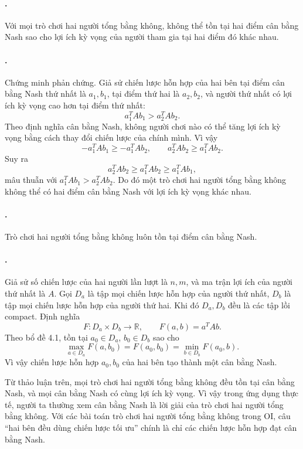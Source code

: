\documentclass[11pt]{article}
\begin{document}
\paragraph{.}
Với mọi trò chơi hai người tổng bằng không, không thể tồn tại hai điểm cân bằng
Nash sao cho lợi ích kỳ vọng của người tham gia tại hai điểm đó khác nhau.

\paragraph{.}
Chứng minh phản chứng. Giả sử chiến lược hỗn hợp của hai bên tại điểm cân bằng
Nash thứ nhất là \(a_1,b_1\), tại điểm thứ hai là \(a_2,b_2\), và người thứ
nhất có lợi ích kỳ vọng cao hơn tại điểm thứ nhất:
\[
  a_1^TAb_1>a_2^TAb_2.
\]
Theo định nghĩa cân bằng Nash, không người chơi nào có thể tăng lợi ích kỳ vọng
bằng cách thay đổi chiến lược của chính mình. Vì vậy
\[
  -a_1^TAb_1\ge -a_1^TAb_2,\qquad
  a_2^TAb_2\ge a_1^TAb_2.
\]
Suy ra
\[
  a_2^TAb_2\ge a_1^TAb_2\ge a_1^TAb_1,
\]
mâu thuẫn với \(a_1^TAb_1>a_2^TAb_2\). Do đó một trò chơi hai người tổng bằng
không không thể có hai điểm cân bằng Nash với lợi ích kỳ vọng khác nhau.

\paragraph{.}
Trò chơi hai người tổng bằng không luôn tồn tại điểm cân bằng Nash.

\paragraph{.}
Giả sử số chiến lược của hai người lần lượt là \(n,m\), và ma trận lợi ích của
người thứ nhất là \(A\). Gọi \(D_a\) là tập mọi chiến lược hỗn hợp của người
thứ nhất, \(D_b\) là tập mọi chiến lược hỗn hợp của người thứ hai. Khi đó
\(D_a,D_b\) đều là các tập lồi compact. Định nghĩa
\[
  F:D_a\times D_b\to\mathbb R,\qquad F(a,b)=a^TAb.
\]
Theo bổ đề 4.1, tồn tại \(a_0\in D_a\), \(b_0\in D_b\) sao cho
\[
  \max_{a\in D_a}F(a,b_0)=F(a_0,b_0)=\min_{b\in D_b}F(a_0,b).
\]
Vì vậy chiến lược hỗn hợp \(a_0,b_0\) của hai bên tạo thành một cân bằng Nash.

Từ thảo luận trên, mọi trò chơi hai người tổng bằng không đều tồn tại cân bằng
Nash, và mọi cân bằng Nash có cùng lợi ích kỳ vọng. Vì vậy trong ứng dụng thực
tế, người ta thường xem cân bằng Nash là lời giải của trò chơi hai người tổng
bằng không. Với các bài toán trò chơi hai người tổng bằng không trong OI, câu
``hai bên đều dùng chiến lược tối ưu'' chính là chỉ các chiến lược hỗn hợp đạt
cân bằng Nash.
\end{document}
